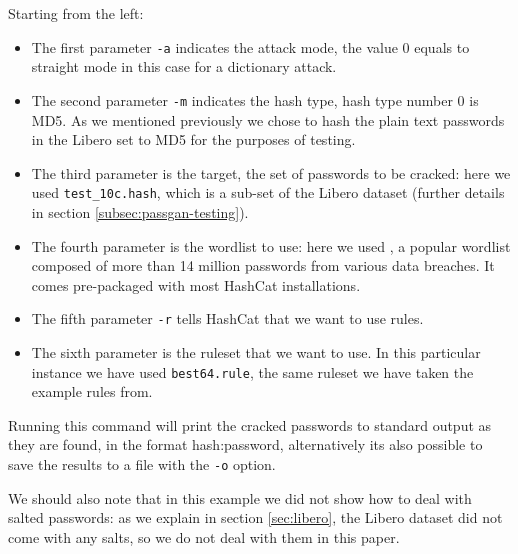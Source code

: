 Starting from the left:
\begin{itemize}
\item The first parameter \texttt{-a} indicates the attack mode, the value 0 equals to straight mode in this case for a dictionary attack.

\item The second parameter \texttt{-m} indicates the hash type, hash type number 0 is MD5. As we mentioned previously we chose to hash the plain text passwords in the Libero set to MD5 for the purposes of testing.

\item The third parameter is the target, the set of passwords to be cracked: here we used \texttt{test\_10c.hash}, which is a sub-set of the Libero dataset (further details in section \ref{subsec:passgan-testing}).

\item The fourth parameter is the wordlist to use: here we used , a popular wordlist composed of more than 14 million passwords from various data breaches. It comes pre-packaged with most HashCat installations.

\item The fifth parameter \texttt{-r} tells HashCat that we want to use rules.

\item The sixth parameter is the ruleset that we want to use. In this particular instance we have used \texttt{best64.rule}, the same ruleset we have taken the example rules from.    
\end{itemize}

Running this command will print the cracked passwords to standard output as they are found, in the format hash:password, alternatively its also possible to save the results to a file with the \texttt{-o} option.

We should also note that in this example we did not show how to deal with salted passwords: as we explain in section \ref{sec:libero}, the Libero dataset did not come with any salts, so we do not deal with them in this paper.
